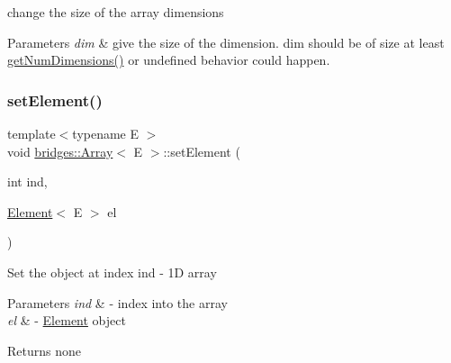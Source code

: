 change the size of the array dimensions 
\begin{DoxyParams}{Parameters}
{\em dim} & give the size of the dimension. dim should be of size at least \mbox{\hyperlink{classbridges_1_1_array_a31edfcff05dd4102fee1840ee915319e}{get\+Num\+Dimensions()}} or undefined behavior could happen. \\
\hline
\end{DoxyParams}
\mbox{\label{classbridges_1_1_array_aa4609a029a5c988c0bb2908030fd9dc5}} 
\subsubsection{\texorpdfstring{set\+Element()}{setElement()}\hspace{0.1cm}{\footnotesize\ttfamily [1/3]}}
{\footnotesize\ttfamily template$<$typename E $>$ \\
void \mbox{\hyperlink{classbridges_1_1_array}{bridges\+::\+Array}}$<$ E $>$\+::set\+Element (\begin{DoxyParamCaption}\item[{int}]{ind,  }\item[{\mbox{\hyperlink{classbridges_1_1_element}{Element}}$<$ E $>$}]{el }\end{DoxyParamCaption})\hspace{0.3cm}{\ttfamily [inline]}}

Set the object at index ind -\/ 1D array


\begin{DoxyParams}{Parameters}
{\em ind} & -\/ index into the array \\
\hline
{\em el} & -\/ \mbox{\hyperlink{classbridges_1_1_element}{Element}} object\\
\hline
\end{DoxyParams}
\begin{DoxyReturn}{Returns}
none 
\end{DoxyReturn}
\mbox{\label{classbridges_1_1_array_a428cc76d22af71c5ae57dc293780b8ec}} 
